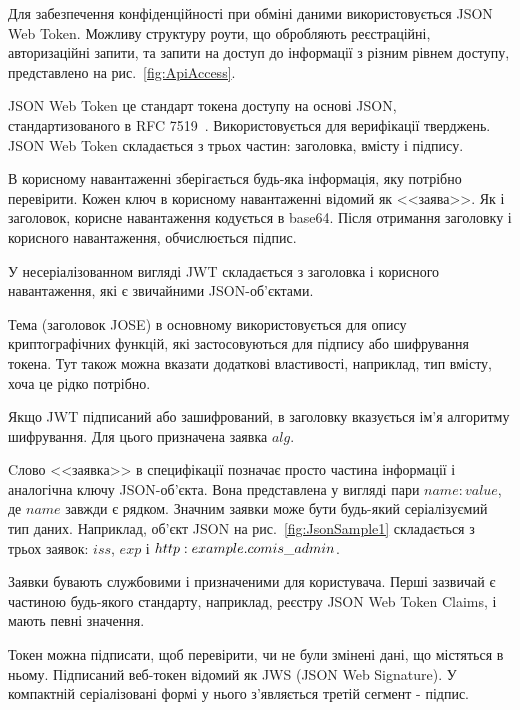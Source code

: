 
Для забезпечення конфіденційності при обміні даними використовується JSON Web Token. Можливу структуру роути, що обробляють реєстраційні, авторизаційні запити, та запити на доступ до інформації з різним рівнем доступу, представлено на рис.~\ref{fig:ApiAccess}.

JSON Web Token це стандарт токена доступу на основі JSON, стандартизованого в RFC 7519~\cite{jones2015json}. Використовується для верифікації тверджень. JSON Web Token складається з трьох частин: заголовка, вмісту і підпису.

В корисному навантаженні зберігається будь-яка інформація, яку потрібно перевірити. Кожен ключ в корисному навантаженні відомий як <<заява>>. Як і заголовок, корисне навантаження кодується в base64. Після отримання заголовку і корисного навантаження, обчислюється підпис.

У несеріалізованном вигляді JWT складається з заголовка і корисного навантаження, які є звичайними JSON-об'єктами.

Тема (заголовок JOSE) в основному використовується для опису криптографічних функцій, які застосовуються для підпису або шифрування токена. Тут також можна вказати додаткові властивості, наприклад, тип вмісту, хоча це рідко потрібно.

Якщо JWT підписаний або зашифрований, в заголовку вказується ім'я алгоритму шифрування. Для цього призначена заявка $alg$.

Cлово <<заявка>> в специфікації позначає просто частина інформації і аналогічна ключу JSON-об'єкта. Вона представлена у вигляді пари $name: value$, де $name$ завжди є рядком. Значним заявки може бути будь-який серіалізуємий тип даних. Наприклад, об'єкт JSON на рис.~\ref{fig:JsonSample1} складається з трьох заявок: $iss$, $exp$ і $http:\/\/example.com\/is\_admin$.


Заявки бувають службовими і призначеними для користувача. Перші зазвичай є частиною будь-якого стандарту, наприклад, реєстру JSON Web Token Claims, і мають певні значення.

Токен можна підписати, щоб перевірити, чи не були змінені дані, що містяться в ньому. Підписаний веб-токен відомий як JWS (JSON Web Signature). У компактній серіалізовані формі у нього з'являється третій сегмент - підпис.

